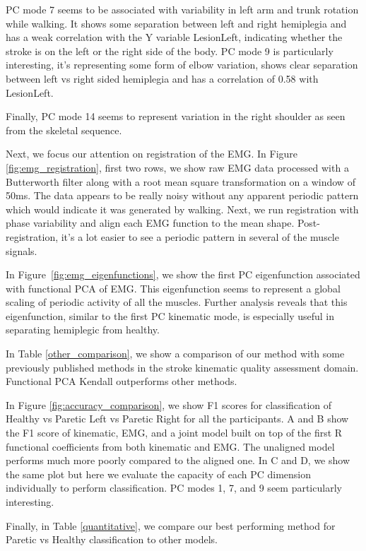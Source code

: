 \documentclass{article}
\begin{document}
PC mode 7 seems to be associated with variability in left arm and trunk rotation while walking. It shows some separation between left and right hemiplegia and has a weak correlation with the Y variable LesionLeft, indicating whether the stroke is on the left or the right side of the body. PC mode 9 is particularly interesting, it's representing some form of elbow variation, shows clear separation between left vs right sided hemiplegia and has a correlation of 0.58 with LesionLeft.

Finally, PC mode 14 seems to represent variation in the right shoulder as seen from the skeletal sequence.

Next, we focus our attention on registration of the EMG. In Figure \ref{fig:emg_registration}, first two rows, we show raw EMG data processed with a Butterworth filter along with a root mean square transformation on a window of 50ms. The data appears to be really noisy without any apparent periodic pattern which would indicate it was generated by walking. Next, we run registration with phase variability and align each EMG function to the mean shape. Post-registration, it's a lot easier to see a periodic pattern in several of the muscle signals.

In Figure~\ref{fig:emg_eigenfunctions}, we show the first PC eigenfunction associated with functional PCA of EMG. This eigenfunction seems to represent a global scaling of periodic activity of all the muscles. Further analysis reveals that this eigenfunction, similar to the first PC kinematic mode, is especially useful in separating hemiplegic from healthy.

In Table \ref{other_comparison}, we show a comparison of our method with some previously published methods in the stroke kinematic quality assessment domain. Functional PCA Kendall outperforms other methods.

In Figure \ref{fig:accuracy_comparison}, we show F1 scores for classification of Healthy vs Paretic Left vs Paretic Right for all the participants. A and B show the F1 score of kinematic, EMG, and a joint model built on top of the first R functional coefficients from both kinematic and EMG. The unaligned model performs much more poorly compared to the aligned one. In C and D, we show the same plot but here we evaluate the capacity of each PC dimension individually to perform classification. PC modes 1, 7, and 9 seem particularly interesting.

Finally, in Table \ref{quantitative}, we compare our best performing method for Paretic vs Healthy classification to other models.
\end{document}
